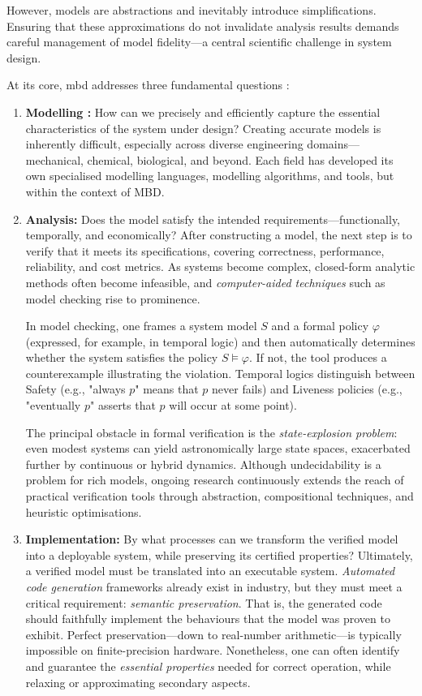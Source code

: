 However, models are abstractions and inevitably introduce simplifications. Ensuring that these approximations do not invalidate analysis results demands careful management of model fidelity—a central scientific challenge in system design.

At its core, \gls{mbd} addresses three fundamental questions \cite{tripakis_compositionality_2016}:
\begin{enumerate}
  \item \textbf{Modelling :} How can we precisely and efficiently capture the essential characteristics of the system under design? Creating accurate models is inherently difficult, especially across diverse engineering domains—mechanical, chemical, biological, and beyond. Each field has developed its own specialised modelling languages, modelling algorithms, and tools, but within the context of MBD.
  \item \textbf{Analysis:} Does the model satisfy the intended requirements—functionally, temporally, and economically? After constructing a model, the next step is to verify that it meets its specifications, covering correctness, performance, reliability, and cost metrics. As systems become complex, closed-form analytic methods often become infeasible, and \emph{computer-aided techniques} such as model checking rise to prominence.

 In model checking, one frames a system model \(S\) and a formal policy \(\varphi\) (expressed, for example, in temporal logic) and then automatically determines whether the system satisfies the policy \(S \models \varphi\). If not, the tool produces a counterexample illustrating the violation. Temporal logics distinguish between Safety (e.g., "always \(p\)" means that \(p\) never fails) and Liveness policies (e.g., "eventually \(p\)" asserts that \(p\) will occur at some point).
  
 The principal obstacle in formal verification is the \emph{state-explosion problem}: even modest systems can yield astronomically large state spaces, exacerbated further by continuous or hybrid dynamics. Although undecidability is a problem for rich models, ongoing research continuously extends the reach of practical verification tools through abstraction, compositional techniques, and heuristic optimisations.
  
  \item \textbf{Implementation:} By what processes can we transform the verified model into a deployable system, while preserving its certified properties? Ultimately, a verified model must be translated into an executable system. \emph{Automated code generation} frameworks already exist in industry, but they must meet a critical requirement: \emph{semantic preservation}. That is, the generated code should faithfully implement the behaviours that the model was proven to exhibit. Perfect preservation—down to real-number arithmetic—is typically impossible on finite-precision hardware. Nonetheless, one can often identify and guarantee the \emph{essential properties} needed for correct operation, while relaxing or approximating secondary aspects. 
\end{enumerate}




